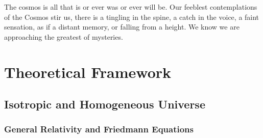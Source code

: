 


\begin{savequote}[50mm]
The cosmos is all that is or ever was or ever will be. Our feeblest contemplations of the Cosmos stir us, there is a tingling in the spine, a catch in the voice, a faint sensation, as if a distant memory, or falling from a height. We know we are approaching the greatest of mysteries.
\end{savequote}

\chapter{Theoretical Framework}
\label{cha:Theoretical Framework}

\ifpdf
    \graphicspath{{2_state_of_the_art/figures/PNG/}{2_state_of_the_art/figures/PDF/}{2_state_of_the_art/figures/}}
\else
    \graphicspath{{2_state_of_the_art/figures/EPS/}{2_state_of_the_art/figures/}}
\fi





\section{Isotropic and Homogeneous Universe}
\label{sec:IsotropicAndHomogeneousUniverse}


	\subsection{General Relativity and Friedmann Equations}
	\label{subsec:GeneralRelativityAndFriedmannEquations}


